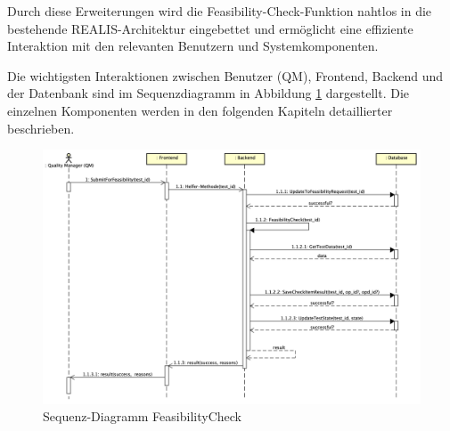 Durch diese Erweiterungen wird die Feasibility-Check-Funktion nahtlos in die bestehende REALIS-Architektur eingebettet und ermöglicht eine effiziente Interaktion mit den relevanten Benutzern und Systemkomponenten.

Die wichtigsten Interaktionen zwischen Benutzer (\gls{QM}), Frontend, Backend und der Datenbank sind im Sequenzdiagramm in Abbildung \ref{fig:sequence-diagram} dargestellt. Die einzelnen Komponenten werden in den folgenden Kapiteln detaillierter beschrieben. 

\begin{figure}[!htbp]
    \centering
    \includegraphics[width=1\textwidth]{bilder/Feasibility-Sequenz-Diagramm.png}
    \caption{Sequenz-Diagramm FeasibilityCheck}
    \label{fig:sequence-diagram}
\end{figure}


